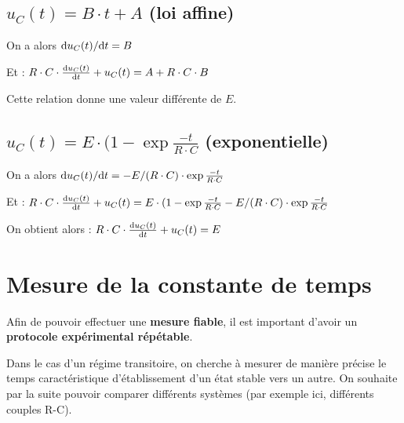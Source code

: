 \documentclass[11pt]{article} %
\begin{document}
\subsection{$u_C(t) = B \cdot t + A$ (loi affine)}

On a alors ${\rm d}u_C(t)/{\rm d}t = B$

Et : $R \cdot C \cdot \frac{{\rm d}u_C(t)}{{\rm d}t} + u_C(t) = A + R \cdot C \cdot B$

Cette relation donne une valeur différente de $E$.

\subsection{$u_C(t) = E \cdot (1 - \exp{\frac{-t}{R \cdot C}}$ (exponentielle)}

On a alors ${\rm d}u_C(t)/{\rm d}t = -E/(R \cdot C) \cdot \exp{\frac{-t}{R \cdot C}}$

Et : $R \cdot C \cdot \frac{{\rm d}u_C(t)}{{\rm d}t} + u_C(t) = E \cdot (1 - \exp{\frac{-t}{R \cdot C}} - E/(R \cdot C) \cdot \exp{\frac{-t}{R \cdot C}}$

On obtient alors : $R \cdot C \cdot \frac{{\rm d}u_C(t)}{{\rm d}t} + u_C(t) = E$

\newpage
\section{Mesure de la constante de temps}

Afin de pouvoir effectuer une \textbf{mesure fiable}, il est important d'avoir un \textbf{protocole expérimental répétable}.

Dans le cas d'un régime transitoire, on cherche à mesurer de manière précise le temps caractéristique d'établissement d'un état stable vers un autre. On souhaite par la suite pouvoir comparer différents systèmes (par exemple ici, différents couples R-C).

\medskip
\end{document}
